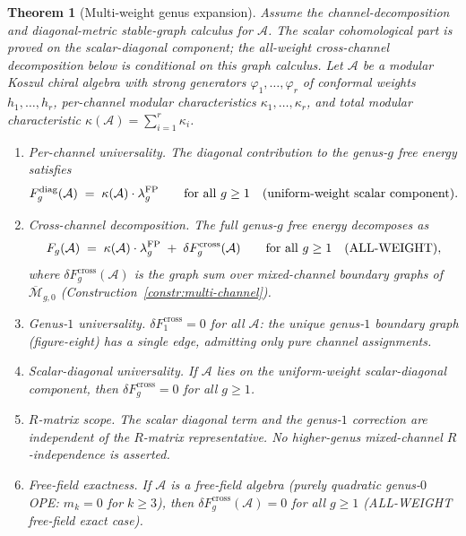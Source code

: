 \documentclass[11pt]{article}
\newtheorem{theorem}{Theorem}[section]
\theoremstyle{definition}
\theoremstyle{remark}
\newcommand{\cA}{\mathcal{A}}
\newcommand{\cM}{\mathcal{M}}
\newcommand{\FP}{\mathrm{FP}}
\newcommand{\diag}{\mathrm{diag}}
\newcommand{\cross}{\mathrm{cross}}
\numberwithin{equation}{section}
\begin{document}
\begin{theorem}[Multi-weight genus expansion]\label{thm:multi-weight-decomposition}
Assume the channel-decomposition and diagonal-metric stable-graph
calculus for \(\cA\). The scalar cohomological part is proved on the
scalar-diagonal component; the all-weight cross-channel decomposition below
is conditional on this graph calculus.
Let $\cA$ be a modular Koszul chiral algebra with
strong generators $\varphi_1, \ldots, \varphi_r$ of conformal
weights $h_1, \ldots, h_r$, per-channel modular characteristics
$\kappa_1, \ldots, \kappa_r$,
and total modular characteristic
$\kappa(\cA) = \sum_{i=1}^r \kappa_i$.
\begin{enumerate}[label=\textup{(\roman*)}]
\item \emph{Per-channel universality.}
 The diagonal contribution to the genus-$g$ free energy satisfies
 \begin{equation}\label{eq:diagonal-universality}
 F_g^{\diag}(\cA)
 \;=\;
 \kappa(\cA) \cdot \lambda_g^{\FP}
 \qquad\text{for all } g \geq 1
 \quad\text{\textup{(}uniform-weight scalar component\textup{)}}.
 \end{equation}

\item \emph{Cross-channel decomposition.}
 The full genus-$g$ free energy decomposes as
 \begin{equation}\label{eq:all-weight-decomposition}
 F_g(\cA)
 \;=\;
 \kappa(\cA) \cdot \lambda_g^{\FP}
 \;+\;
 \delta F_g^{\cross}(\cA)
 \qquad\text{for all } g \geq 1
 \quad\text{\textup{(}ALL-WEIGHT\textup{)}},
 \end{equation}
 where $\delta F_g^{\cross}(\cA)$ is the graph sum over
 mixed-channel boundary graphs of $\overline{\cM}_{g,0}$
 \textup{(}Construction~\textup{\ref{constr:multi-channel}}\textup{)}.

\item \emph{Genus-$1$ universality.}
 $\delta F_1^{\cross} = 0$ for all $\cA$:
 the unique genus-$1$ boundary graph \textup{(}figure-eight\textup{)}
 has a single edge, admitting only pure channel assignments.

\item \emph{Scalar-diagonal universality.}
 If $\cA$ lies on the uniform-weight scalar-diagonal component, then
 $\delta F_g^{\cross} = 0$ for all $g \geq 1$.

\item \emph{$R$-matrix scope.}
 The scalar diagonal term and the genus-$1$ correction are
 independent of the $R$-matrix representative. No higher-genus
 mixed-channel $R$-independence is asserted.

\item \emph{Free-field exactness.}
 If $\cA$ is a free-field algebra \textup{(}purely quadratic
 genus-$0$ OPE: $m_k = 0$ for $k \geq 3$\textup{)}, then
 $\delta F_g^{\cross}(\cA) = 0$ for all $g \geq 1$
 \textup{(}ALL-WEIGHT free-field exact case\textup{)}.
\end{enumerate}
\end{theorem}
\end{document}
